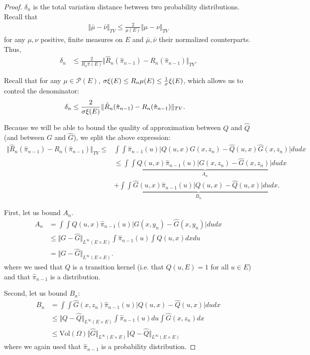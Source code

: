 \begin{proof}
$\delta_n$ is the total variation distance between two probability distributions. Recall that
\begin{align}
    \Vert \bar \mu - \bar \nu\Vert_{TV} \leq \frac{2}{\mu(E)}\Vert \mu - \nu\Vert_{TV}
\end{align}
for any $\mu, \nu$ positive, finite measures on $E$ and $\bar \mu, \bar \nu$ their normalized counterparts.
Thus,
\begin{align}
    \delta_n & \leq \frac{2}{R_n\hat\pi(E)}\Vert\hat R_n(\hat\pi_{n-1}) - R_n(\hat\pi_{n-1})\Vert_{TV}.
\end{align}

Recall that for any $\mu\in\mathcal P(E)$, $\sigma\xi(E) \leq R_n\mu(E)\leq \frac{1}{\sigma}\xi(E)$, which allows us to control the denominator:
\begin{align}
    \delta_n & \leq \frac{2}{\sigma\xi(E)}\Vert\hat R_n(\hat\pi_{n-1}) - R_n(\hat\pi_{n-1})\Vert_{TV}.
\end{align}

Because we will be able to bound the quality of approximation between $Q$ and $\hat Q$ (and between $G$ and $\hat G$), we split the above expression:
\begin{align}
\Vert\hat R_n(\hat\pi_{n-1}) - R_n(\hat\pi_{n-1})\Vert_{TV} \leq& \int\int \hat \pi_{n-1}(u)\vert Q(u, x)G(x, z_n) - \hat Q(u, x)\hat G(x, z_n)\vert dudx\\
& \leq \underbrace{\int\int Q(u, x) \hat \pi_{n-1}(u)\vert G(x, z_n) - \hat G(x, z_n)\vert dudx}_{A_n}\label{eq:delta-a} \\
& + \underbrace{\int\int \hat G(u, x) \hat \pi_{n-1}(u)\vert Q(u, x) - \hat Q(u, x)\vert dudx}_{B_n}.\label{eq:delta-b}
\end{align}

First, let us bound $A_n$.
\begin{align}
A_n &= \int\int Q(u, x) \hat \pi_{n-1}(u)\vert G(x, y_n) - \hat G(x, y_n)\vert dudx\\
&\leq \Vert G-\hat G\Vert_{L^\infty(E\times E)}\int \hat\pi_{n-1}(u)\int Q(u,x)dxdu\\
&= \Vert G-\hat G\Vert_{L^\infty(E\times E)}.
\end{align}
where we used that $Q$ is a transition kernel (i.e. that $Q(u, E)=1$ for all $u\in E$) and that $\hat\pi_{n-1}$ is a distribution.

Second, let us bound $B_n$:
\begin{align}
B_n &= \int\int \hat G(x, z_n) \hat \pi_{n-1}(u)\vert Q(u, x) - \hat Q(u, x)\vert dudx\\
    &\leq \Vert Q-\hat Q\Vert_{L^\infty(E\times E)}\int \hat \pi_{n-1}(u)du \int \hat G(x, z_n)dx\\
    &\leq \textrm{Vol}(\Omega)\Vert \hat G\Vert_{L^\infty(E\times E)}\Vert Q-\hat Q\Vert_{L^\infty(E\times E)}
\end{align}
where we again used that $\hat \pi_{n-1}$ is a probability distribution.
\end{proof}

